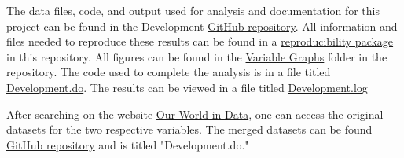 \documentclass[12pt]{article}
\begin{document}
The data files, code, and output used for analysis and documentation for this project can be found in the Development \href{https://github.com/ecn310/course-project-developmentv}{GitHub repository}. All information and files needed to reproduce these results can be found in a \href{https://github.com/ecn310/course-project-development/tree/main/Reproducibility%20Package}{reproducibility package} in this repository. All figures can be found in the \href{https://github.com/ecn310/course-project-development/tree/main/Variable%20Graphs}{Variable Graphs} folder in the repository. The code used to complete the analysis is in a file titled \href{https://github.com/ecn310/course-project-development/tree/main/Reproducibility%20Package}{Development.do}. 
The results can be viewed in a file titled \href{https://github.com/ecn310/course-project-development/blob/main/Merge_GDP_Mftc.log}{Development.log} 
 
 After searching on the website  \href{https://ourworldindata.org/}{Our World in Data}, one can access the original datasets for the two respective variables. The merged datasets can be found \href{https://github.com/ecn310/course-project-developmentv}{GitHub repository} and is titled "Development.do."
\end{document}
